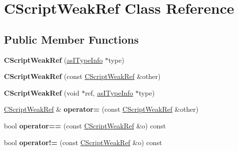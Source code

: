 \hypertarget{class_c_script_weak_ref}{}\section{C\+Script\+Weak\+Ref Class Reference}
\label{class_c_script_weak_ref}
\subsection*{Public Member Functions}
\begin{DoxyCompactItemize}
\item 
\mbox{\label{class_c_script_weak_ref_a0fb13bac73e0f045219f242c9b9b9545}} 
{\bfseries C\+Script\+Weak\+Ref} (\hyperlink{classas_i_type_info}{as\+I\+Type\+Info} $\ast$type)
\item 
\mbox{\label{class_c_script_weak_ref_afe9e9ddaf9cf1fa2da9bda0f1fb25be8}} 
{\bfseries C\+Script\+Weak\+Ref} (const \hyperlink{class_c_script_weak_ref}{C\+Script\+Weak\+Ref} \&other)
\item 
\mbox{\label{class_c_script_weak_ref_a4594d336a98119b14443777eb12f464c}} 
{\bfseries C\+Script\+Weak\+Ref} (void $\ast$ref, \hyperlink{classas_i_type_info}{as\+I\+Type\+Info} $\ast$type)
\item 
\mbox{\label{class_c_script_weak_ref_a4b73ce0198d2ab91096ea9faff623ad3}} 
\hyperlink{class_c_script_weak_ref}{C\+Script\+Weak\+Ref} \& {\bfseries operator=} (const \hyperlink{class_c_script_weak_ref}{C\+Script\+Weak\+Ref} \&other)
\item 
\mbox{\label{class_c_script_weak_ref_ad05495d94a7cbe1f5f2d6b53349c2d17}} 
bool {\bfseries operator==} (const \hyperlink{class_c_script_weak_ref}{C\+Script\+Weak\+Ref} \&o) const
\item 
\mbox{\label{class_c_script_weak_ref_a2241999e2aa79a90c8b26b2e7652b1dd}} 
bool {\bfseries operator!=} (const \hyperlink{class_c_script_weak_ref}{C\+Script\+Weak\+Ref} \&o) const
\item 
\mbox{\label{class_c_script_weak_ref_ae6bdf58513878e0666071c220503c39c}} 

\end{DoxyCompactItemize}
